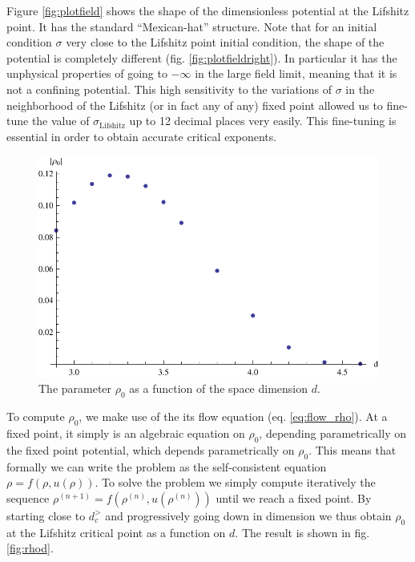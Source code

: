Figure \eqref{fig:plotfield} shows the shape of the dimensionless potential at the Lifshitz point. It has the standard ``Mexican-hat'' structure. Note that for an initial condition $\sigma$ very close to the Lifshitz point initial condition, the shape of the potential is completely different (fig. \eqref{fig:plotfieldright}). In particular it has the unphysical properties of going to $-\infty$ in the large field limit, meaning that it is not a confining potential. This high sensitivity to the variations of $\sigma$ in the neighborhood of the Lifshitz (or in fact any of any) fixed point allowed us to fine-tune the value of $\sigma_{\text{Lifshitz}}$ up to 12 decimal places very easily. This fine-tuning is essential in order to obtain accurate critical exponents.

\begin{figure}[htp]
\begin{center}
\includegraphics[scale=0.7]{img/chap4/rhod.pdf}
\caption{The parameter $\rho_0$ as a function of the space dimension $d$.}
\label{fig:rhod}
\end{center}
\end{figure}

To compute $\rho_0$, we make use of the its flow equation (eq. \eqref{eq:flow_rho}). At a fixed point, it simply is an algebraic equation on $\rho_0$, depending parametrically on the fixed point potential, which depends parametrically on $\rho_0$.  This means that formally we can write the problem as the self-consistent equation $\rho = f(\rho, u(\rho))$. To solve the problem we simply compute iteratively the sequence $\rho^{(n+1)} = f(\rho^{(n)}, u(\rho^{(n)}))$ until we reach a fixed point. By starting close to $d_c^>$ and progressively going down in dimension we thus obtain $\rho_0$ at the Lifshitz critical point as a function on $d$. The result is shown in fig. \eqref{fig:rhod}. 


